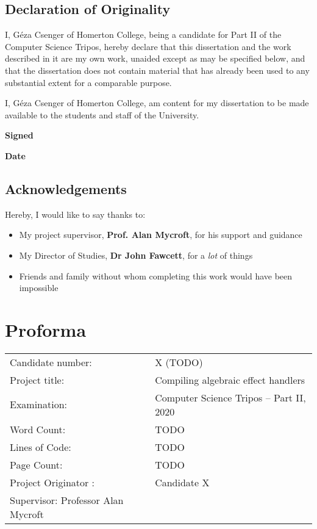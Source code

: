 \documentclass[%
    oneside,
    bibliography=toc,
    listof=leveldown,%
    fontsize=11pt
]{scrbook}
\begin{document}


\frontmatter

\section*{Declaration of Originality}

I, Géza Csenger of Homerton College,
being a candidate for Part II of the Computer Science Tripos,
hereby declare that this dissertation and the work described in it
are my own work, unaided except as may be specified below, and
that the dissertation does not contain material that has already
been used to any substantial extent for a comparable purpose.

I, Géza Csenger of Homerton College,
am content for my dissertation to be made available to the students and staff of the University. 

\vspace{1cm}
\textbf{Signed}

\vspace{1cm}
\textbf{Date}

\vspace{3cm}

\section*{Acknowledgements}

Hereby, I would like to say thanks to:
\begin{itemize}
    \item My project supervisor, \textbf{Prof. Alan Mycroft}, for his support and guidance
    \item My Director of Studies, \textbf{Dr John Fawcett}, for a \emph{lot} of things
    \item Friends and family without whom completing this work would have been impossible
\end{itemize}

\newpage

\chapter{Proforma}

\begin{tabular}{@{} ll @{}}
Candidate number: & X (TODO) \\
Project title: & Compiling algebraic effect handlers \\
Examination: & Computer Science Tripos -- Part II, 2020 \\
Word Count: & TODO \\
Lines of Code: & TODO \\
Page Count: & TODO \\
Project Originator : & Candidate X \\
Supervisor: Professor Alan Mycroft \\
\end{tabular}
\end{document}
